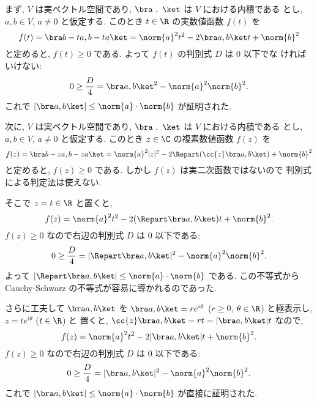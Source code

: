 \documentclass[12pt,twoside]{jarticle}
\begin{document}
まず, $V$ は実ベクトル空間であり, $\bra\ ,\ \ket$ は $V$ における内積である
とし, $a,b\in V$, $a\ne 0$ と仮定する. 
このとき $t\in\R$ の実数値函数 $f(t)$ を
\begin{equation*}
  f(t) 
  = \bra b - ta, b - ta\ket
  = \norm{a}^2 t^2 - 2\bra a,b\ket t + \norm{b}^2
\end{equation*}
と定めると, $f(t)\ge 0$ である.  よって $f(t)$ の判別式 $D$ は $0$ 以下でな
ければいけない:
\begin{equation*}
  0 \ge \frac{D}{4} = \bra a,b\ket^2 - \norm{a}^2\norm{b}^2.
\end{equation*}
これで $|\bra a,b\ket| \le \norm{a}\cdot\norm{b}$ が証明された.

次に, $V$ は実ベクトル空間であり, $\bra\ ,\ \ket$ は $V$ における内積である
とし, $a,b\in V$, $a\ne 0$ と仮定する.
このとき $z\in \C$ の複素数値函数 $f(z)$ を
\begin{equation*}
  f(z) = \bra b - za, b - za\ket
  = \norm{a}^2 |z|^2 - 2\Repart(\cc{z}\bra a,b\ket) + \norm{b}^2
\end{equation*}
と定めると, $f(z)\ge 0$ である.  しかし $f(z)$ は実二次函数ではないので
判別式による判定法は使えない.  

そこで $z=t\in\R$ と置くと,
\begin{equation*}
  f(z) = \norm{a}^2 t^2 - 2(\Repart\bra a,b\ket)t + \norm{b}^2.
\end{equation*}
$f(z)\ge 0$ なので右辺の判別式 $D$ は $0$ 以下である:
\begin{equation*}
  0 \ge \frac{D}{4} = |\Repart\bra a,b\ket|^2 - \norm{a}^2\norm{b}^2.
\end{equation*}
よって $|\Repart\bra a,b\ket|\le\norm{a}\cdot\norm{b}$ である.
この不等式から Cauchy-Schwarz の不等式が容易に導かれるのであった.

さらに工夫して $\bra a,b\ket$ を $\bra a,b\ket = r e^{i\theta}$ 
($r\ge 0$, $\theta\in\R$) と極表示し, $z = te^{i\theta}$ ($t\in\R$) と
置くと, $\cc{z}\bra a,b\ket = rt = |\bra a,b\ket|t$ なので,
\begin{equation*}
  f(z) = \norm{a}^2 t^2 - 2|\bra a,b\ket|t + \norm{b}^2.
\end{equation*}
$f(z)\ge 0$ なので右辺の判別式 $D$ は $0$ 以下である:
\begin{equation*}
  0 \ge \frac{D}{4} = |\bra a,b\ket|^2 - \norm{a}^2\norm{b}^2.
\end{equation*}
これで $|\bra a,b\ket| \le \norm{a}\cdot\norm{b}$ が直接に証明された.

\end{document}
